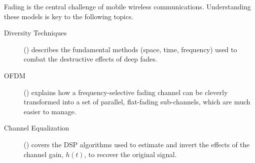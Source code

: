\begin{importantbox}[title={Further Reading}]
    Fading is the central challenge of mobile wireless communications. Understanding these models is key to the following topics.
    \begin{description}
        \item[Diversity Techniques] () describes the fundamental methods (space, time, frequency) used to combat the destructive effects of deep fades.
        \item[OFDM] () explains how a frequency-selective fading channel can be cleverly transformed into a set of parallel, flat-fading sub-channels, which are much easier to manage.
        \item[Channel Equalization] () covers the DSP algorithms used to estimate and invert the effects of the channel gain, $h(t)$, to recover the original signal.
    \end{description}
\end{importantbox}